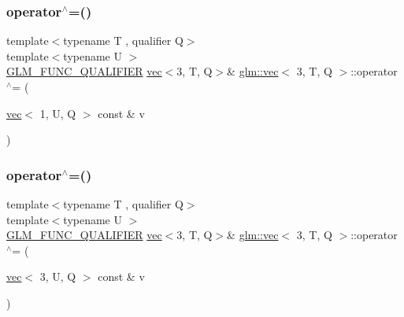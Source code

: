 \mbox{\label{structglm_1_1vec_3_013_00_01_t_00_01_q_01_4_af7af47fbde4d53045b59d69a7563eba7}} 
\subsubsection{\texorpdfstring{operator$^\wedge$=()}{operator^=()}\hspace{0.1cm}{\footnotesize\ttfamily [5/6]}}
{\footnotesize\ttfamily template$<$typename T , qualifier Q$>$ \\
template$<$typename U $>$ \\
\hyperlink{setup_8hpp_a33fdea6f91c5f834105f7415e2a64407}{G\+L\+M\+\_\+\+F\+U\+N\+C\+\_\+\+Q\+U\+A\+L\+I\+F\+I\+ER} \hyperlink{structglm_1_1vec}{vec}$<$3, T, Q$>$\& \hyperlink{structglm_1_1vec}{glm\+::vec}$<$ 3, T, Q $>$\+::operator$^\wedge$= (\begin{DoxyParamCaption}\item[{\hyperlink{structglm_1_1vec}{vec}$<$ 1, U, Q $>$ const \&}]{v }\end{DoxyParamCaption})}

\mbox{\label{structglm_1_1vec_3_013_00_01_t_00_01_q_01_4_abff32960a1defbf3301e8caa8c9fa1f6}} 
\subsubsection{\texorpdfstring{operator$^\wedge$=()}{operator^=()}\hspace{0.1cm}{\footnotesize\ttfamily [6/6]}}
{\footnotesize\ttfamily template$<$typename T , qualifier Q$>$ \\
template$<$typename U $>$ \\
\hyperlink{setup_8hpp_a33fdea6f91c5f834105f7415e2a64407}{G\+L\+M\+\_\+\+F\+U\+N\+C\+\_\+\+Q\+U\+A\+L\+I\+F\+I\+ER} \hyperlink{structglm_1_1vec}{vec}$<$3, T, Q$>$\& \hyperlink{structglm_1_1vec}{glm\+::vec}$<$ 3, T, Q $>$\+::operator$^\wedge$= (\begin{DoxyParamCaption}\item[{\hyperlink{structglm_1_1vec}{vec}$<$ 3, U, Q $>$ const \&}]{v }\end{DoxyParamCaption})}

